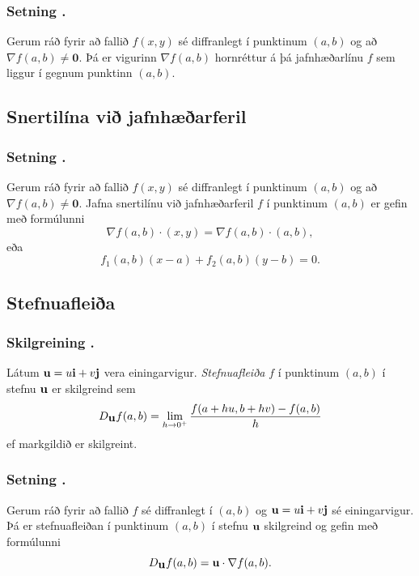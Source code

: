 \subsubsection{Setning \kaflanr.}
  Gerum ráð fyrir að fallið $f(x,y)$ sé
diffranlegt í punktinum $(a,b)$ og að $\nabla f(a,b) \neq \mathbf{0}$.  Þá er vigurinn $\nabla f(a,b)$ 
hornréttur á þá jafnhæðarlínu $f$ sem liggur í gegnum punktinn $(a,b)$.








\subsection{Snertilína við jafnhæðarferil} 

\subsubsection{Setning \kaflanr.}
  Gerum ráð fyrir að fallið $f(x,y)$ sé
diffranlegt í punktinum $(a,b)$ og að $\nabla f(a,b) \neq \mathbf{0}$.  Jafna snertilínu við jafnhæðarferil $f$ í punktinum $(a,b)$ er gefin
með formúlunni 
$$\nabla f(a,b)\cdot (x,y)=\nabla f(a,b)\cdot (a,b),$$
eða 
$$f_1(a,b)(x-a)+f_2(a,b)(y-b)=0.$$




\subsection{Stefnuafleiða} 

\subsubsection{Skilgreining \kaflanr.}
 Látum $\mbox{${\bf u}$}=u\mbox{${\bf i}$}+v\mbox{${\bf j}$}$ vera einingarvigur.  {\em
  Stefnuafleiða } $f$ í punktinum $(a,b)$ í stefnu $\mbox{${\bf u}$}$ er skilgreind
  sem 
$$D_{\mbox{${\bf u}$}}f(a,b)=\lim_{h\rightarrow 0^+}\frac{f(a+hu, b+hv)-f(a,b)}{h}$$
ef markgildið er skilgreint.  




\subsubsection{Setning \kaflanr.}
Gerum ráð fyrir að fallið $f$ sé diffranlegt í
$(a,b)$ og $\mbox{${\bf u}$}=u\mbox{${\bf i}$}+v\mbox{${\bf j}$}$ sé einingarvigur.  Þá er stefnuafleiðan í
punktinum $(a,b)$ í stefnu $\mbox{${\bf u}$}$ skilgreind og gefin með formúlunni
$$D_{\mbox{${\bf u}$}}f(a,b)=\mbox{${\bf u}$}\cdot \nabla f(a,b).$$




